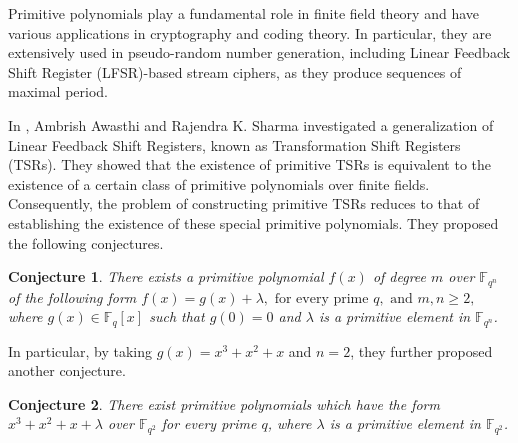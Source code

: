 \documentclass[preprint,12pt]{elsarticle}
\newtheorem{con}{Conjecture}[section]
\begin{document}
       Primitive polynomials play a fundamental role in finite field theory and have various applications in cryptography and coding theory. In particular, they are extensively used in pseudo-random number generation, including Linear Feedback Shift Register (LFSR)-based stream ciphers, as they produce sequences of maximal period.

       In \cite{TSR}, Ambrish Awasthi and Rajendra K. Sharma investigated a generalization of Linear Feedback Shift Registers, known as Transformation Shift Registers (TSRs). They showed that the existence of primitive TSRs is equivalent to the existence of a certain class of primitive polynomials over finite fields. Consequently, the problem of constructing primitive TSRs reduces to that of establishing the existence of these special primitive polynomials. They proposed the following conjectures.
  
    \begin{con}\label{Con1.1}
        There exists a primitive polynomial $f(x)$ of degree $m$ over $\mathbb{F}_{q^n}$ of the following form $f(x)=g(x)+\lambda, \text{ for every prime }q, \text{ and } m,n\geq 2,$ where $g(x)\in\mathbb{F}_{q}[x]$ such that $g(0)=0$ and $\lambda$ is a primitive element in $\mathbb{F}_{q^n}$.
    \end{con}

    In particular, by taking $g(x)=x^3+x^2+x$ and $n=2$, they further proposed another conjecture.
    
    \begin{con}\label{Con1.2}
        There exist primitive polynomials which have the form $x^3 + x^2 + x + \lambda$ over $\mathbb{F}_{q^2}$ for every prime $q$, where $\lambda$ is a primitive element in $\mathbb{F}_{q^2}$.
    \end{con}
\end{document}
